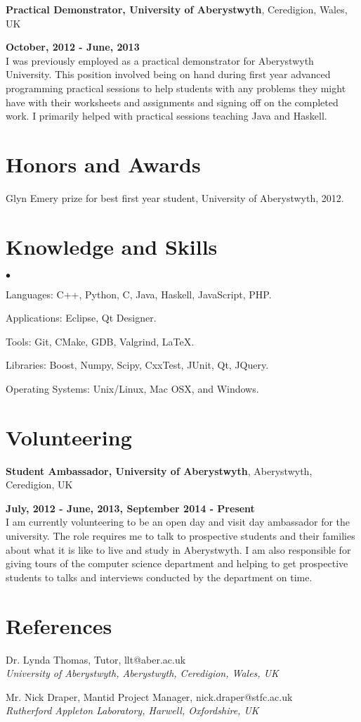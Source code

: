 \documentclass[margin,line]{res}
\newenvironment{list2}{
  \begin{list}{$\bullet$}{%
      \setlength{\itemsep}{0in}
      \setlength{\parsep}{0in} \setlength{\parskip}{0in}
      \setlength{\topsep}{0in} \setlength{\partopsep}{0in} 
      \setlength{\leftmargin}{0.2in}}}{\end{list}}
\begin{document}
\begin{resume}
{\bf Practical Demonstrator, University of Aberystwyth}, Ceredigion, Wales, UK

\vspace{-.3cm}
\hfill {\bf  October, 2012 - June, 2013}\\
I was previously employed as a practical demonstrator for Aberystwyth University. This position involved being on hand during first year advanced programming practical sessions to help students with any problems they might have with their worksheets and assignments and signing off on the completed work. I primarily helped with practical sessions teaching Java and Haskell.

\section{\sc Honors and Awards} 
Glyn Emery prize for best first year student, University of Aberystwyth, 2012.

\section{\sc Knowledge and  Skills} 
\begin{list2}
\item Languages:  C++, Python, C, Java, Haskell, JavaScript, PHP.
\item Applications: Eclipse, Qt Designer.
\item Tools: Git, CMake, GDB, Valgrind, \LaTeX.
\item Libraries: Boost, Numpy, Scipy, CxxTest, JUnit, Qt, JQuery.
\item Operating Systems:  Unix/Linux, Mac OSX, and Windows.\\ 
\end{list2}

\section{\sc Volunteering} 
{\bf Student Ambassador, University of Aberystwyth}, Aberystwyth, Ceredigion, UK

\vspace{-.3cm}
\hfill {\bf July, 2012 - June, 2013, September 2014 - Present}\\
I am currently volunteering to be an open day and visit day ambassador for the university. The role requires me to talk to prospective students and their families about what it is like to live and study in Aberystwyth. I am also responsible for giving tours of the computer science department and helping to get prospective students to talks and interviews conducted by the department on time.

\section{\sc References}
Dr. Lynda Thomas, Tutor, llt@aber.ac.uk \\
{\em University of Aberystwyth, Aberystwyth, Ceredigion, Wales, UK}

Mr. Nick Draper, Mantid Project Manager, nick.draper@stfc.ac.uk \\	
{\em Rutherford Appleton Laboratory, Harwell, Oxfordshire, UK}

\end{resume}
\end{document}
